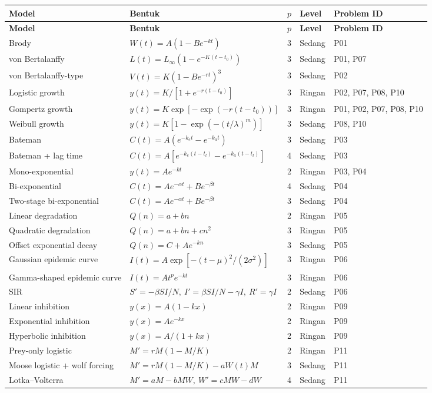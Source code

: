 \documentclass[11pt,a4paper]{article}
\begin{document}
\begin{longtable}{L{3.6cm} L{5.2cm} C{0.8cm} C{1.2cm} L{3.2cm}}
\toprule
\textbf{Model} & \textbf{Bentuk} & \textbf{$p$} & \textbf{Level} & \textbf{Problem ID} \\
\midrule
\endfirsthead
\toprule
\textbf{Model} & \textbf{Bentuk} & \textbf{$p$} & \textbf{Level} & \textbf{Problem ID} \\
\midrule
\endhead
Brody & $W(t)=A(1-Be^{-kt})$ & 3 & Sedang & P01 \\
von Bertalanffy & $L(t)=L_\infty(1-e^{-K(t-t_0)})$ & 3 & Sedang & P01, P07 \\
von Bertalanffy-type & $V(t)=K(1-Be^{-rt})^3$ & 3 & Sedang & P02 \\
Logistic growth & $y(t)=K/[1+e^{-r(t-t_0)}]$ & 3 & Ringan & P02, P07, P08, P10 \\
Gompertz growth & $y(t)=K\exp[-\exp(-r(t-t_0))]$ & 3 & Ringan & P01, P02, P07, P08, P10 \\
Weibull growth & $y(t)=K[1-\exp(-(t/\lambda)^m)]$ & 3 & Sedang & P08, P10 \\
Bateman & $C(t)=A(e^{-k_e t}-e^{-k_a t})$ & 3 & Sedang & P03 \\
Bateman + lag time & $C(t)=A[e^{-k_e(t-t_l)}-e^{-k_a(t-t_l)}]$ & 4 & Sedang & P03 \\
Mono-exponential & $y(t)=A e^{-kt}$ & 2 & Ringan & P03, P04 \\
Bi-exponential & $C(t)=A e^{-\alpha t}+B e^{-\beta t}$ & 4 & Sedang & P04 \\
Two-stage bi-exponential & $C(t)=A e^{-\alpha t}+B e^{-\beta t}$ & 3 & Sedang & P04 \\
Linear degradation & $Q(n)=a+bn$ & 2 & Ringan & P05 \\
Quadratic degradation & $Q(n)=a+bn+cn^2$ & 3 & Ringan & P05 \\
Offset exponential decay & $Q(n)=C+A e^{-kn}$ & 3 & Sedang & P05 \\
Gaussian epidemic curve & $I(t)=A\exp[-(t-\mu)^2/(2\sigma^2)]$ & 3 & Ringan & P06 \\
Gamma-shaped epidemic curve & $I(t)=A t^p e^{-kt}$ & 3 & Ringan & P06 \\
SIR & $S'=-\beta SI/N,\ I'=\beta SI/N-\gamma I,\ R'=\gamma I$ & 2 & Sedang & P06 \\
Linear inhibition & $y(x)=A(1-kx)$ & 2 & Ringan & P09 \\
Exponential inhibition & $y(x)=A e^{-kx}$ & 2 & Ringan & P09 \\
Hyperbolic inhibition & $y(x)=A/(1+kx)$ & 2 & Ringan & P09 \\
Prey-only logistic & $M'=rM(1-M/K)$ & 2 & Ringan & P11 \\
Moose logistic + wolf forcing & $M'=rM(1-M/K)-aW(t)M$ & 3 & Sedang & P11 \\
Lotka–Volterra & $M'=aM-bMW,\ W'=cMW-dW$ & 4 & Sedang & P11 \\
\bottomrule
\end{longtable}
\end{document}
